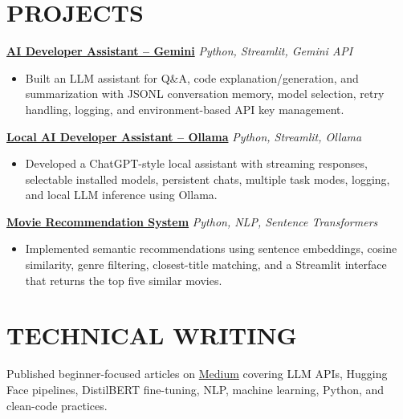 \documentclass[10pt,a4paper]{article}
\newcommand{\project}[3]{%
  \textbf{\href{#2}{#1}} \hfill \textit{#3}\\[-1pt]
}
\begin{document}
\section{PROJECTS}
\project{AI Developer Assistant -- Gemini}{https://github.com/Karanveer05/AI-Developer-Assistant-CLI}{Python, Streamlit, Gemini API}
\begin{itemize}
    \item Built an LLM assistant for Q\&A, code explanation/generation, and summarization with JSONL conversation memory, model selection, retry handling, logging, and environment-based API key management.
\end{itemize}

\project{Local AI Developer Assistant -- Ollama}{https://github.com/Karanveer05/Ollama-ChatGPT-Style-Assistant}{Python, Streamlit, Ollama}
\begin{itemize}
    \item Developed a ChatGPT-style local assistant with streaming responses, selectable installed models, persistent chats, multiple task modes, logging, and local LLM inference using Ollama.
\end{itemize}

\project{Movie Recommendation System}{https://github.com/Karanveer05/MOVIE_RECOMMENDATION_Project}{Python, NLP, Sentence Transformers}
\begin{itemize}
    \item Implemented semantic recommendations using sentence embeddings, cosine similarity, genre filtering, closest-title matching, and a Streamlit interface that returns the top five similar movies.
\end{itemize}

\section{TECHNICAL WRITING}
Published beginner-focused articles on \href{https://medium.com/@karanveernetsquaresoftwares}{Medium} covering LLM APIs, Hugging Face pipelines, DistilBERT fine-tuning, NLP, machine learning, Python, and clean-code practices.
\end{document}

